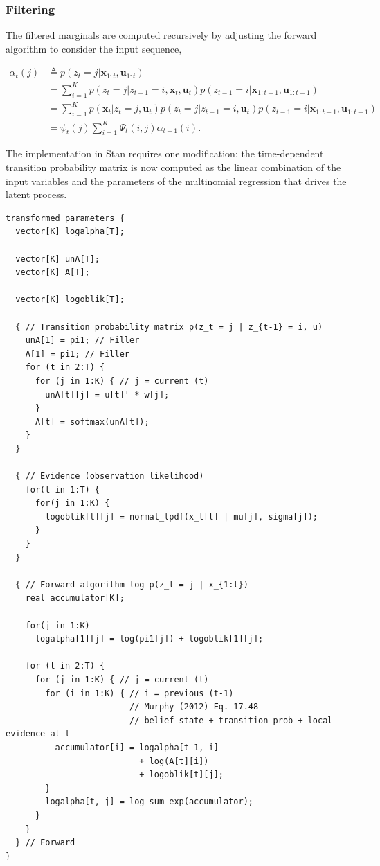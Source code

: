 \documentclass[]{article}
\newcommand{\mat}[1]{\mathbf{#1}}
\begin{document}
{{{\subsubsection{Filtering}\label{filtering-1}

The filtered marginals are computed recursively by adjusting the forward
algorithm to consider the input sequence,

\begin{align*}
\alpha_t(j)
  & \triangleq p(z_t = j | \mat{x}_{1:t}, \mat{u}_{1:t}) \\
  & = \sum_{i = 1}^{K}{p(z_t = j | z_{t-1} = i, \mat{x}_{t}, \mat{u}_{t}) p(z_{t-1} = i | \mat{x}_{1:t-1}, \mat{u}_{1:t-1})} \\
  & = \sum_{i = 1}^{K}{p(\mat{x}_{t} | z_t = j, \mat{u}_t) p(z_t = j | z_{t-1} = i, \mat{u}_{t}) p(z_{t-1} = i | \mat{x}_{1:t-1}, \mat{u}_{1:t-1})} \\
  & = \psi_t(j) \sum_{i = 1}^{K}{\Psi_t(i, j) \alpha_{t-1}(i)}.
\end{align*}

The implementation in Stan requires one modification: the time-dependent
transition probability matrix is now computed as the linear combination
of the input variables and the parameters of the multinomial regression
that drives the latent process.

\begin{verbatim}
transformed parameters {
  vector[K] logalpha[T];

  vector[K] unA[T];
  vector[K] A[T];

  vector[K] logoblik[T];

  { // Transition probability matrix p(z_t = j | z_{t-1} = i, u)
    unA[1] = pi1; // Filler
    A[1] = pi1; // Filler
    for (t in 2:T) {
      for (j in 1:K) { // j = current (t)
        unA[t][j] = u[t]' * w[j];
      }
      A[t] = softmax(unA[t]);
    }
  }

  { // Evidence (observation likelihood)
    for(t in 1:T) {
      for(j in 1:K) {
        logoblik[t][j] = normal_lpdf(x_t[t] | mu[j], sigma[j]);
      }
    }
  }

  { // Forward algorithm log p(z_t = j | x_{1:t})
    real accumulator[K];

    for(j in 1:K)
      logalpha[1][j] = log(pi1[j]) + logoblik[1][j];

    for (t in 2:T) {
      for (j in 1:K) { // j = current (t)
        for (i in 1:K) { // i = previous (t-1)
                         // Murphy (2012) Eq. 17.48
                         // belief state + transition prob + local evidence at t
          accumulator[i] = logalpha[t-1, i] 
                           + log(A[t][i]) 
                           + logoblik[t][j];
        }
        logalpha[t, j] = log_sum_exp(accumulator);
      }
    }
  } // Forward
}
\end{verbatim}

}}}
\end{document}
